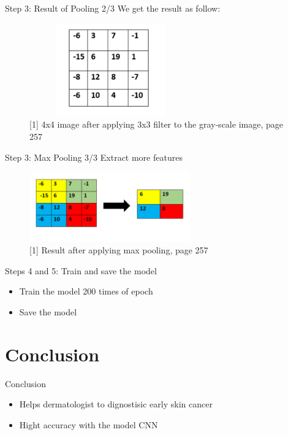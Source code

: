 \documentclass{beamer}
\begin{document}
\begin{frame}{Step 3: Result of Pooling 2/3}
We get the result as follow:
\begin{figure}[H]
    \includegraphics[width=7cm,height=4cm]{images/pooling.png}
    \caption{[1] 4x4 image after applying 3x3 filter to the gray-scale image, page 257}
    \label{fig:L1}
\end{figure}
\end{frame} 

\begin{frame}{Step 3: Max Pooling 3/3}
Extract more features
\begin{figure}[H]
    \includegraphics[width=7cm,height=3cm]{images/maxpooling.png}
    \caption{[1] Result after applying max pooling, page 257}
    \label{fig:L1}
\end{figure}
\end{frame} 

\begin{frame}{Steps 4 and 5: Train and save the model}
\begin{itemize}
		\item  Train the model 200 times of epoch
		\item Save the model 
\end{itemize}
\end{frame} 




\section{Conclusion}
\begin{frame}{Conclusion}
\begin{itemize}
		\item Helps dermatologist to dignostisic early skin cancer 
		\item Hight accuracy with the model CNN
\end{itemize}
\end{frame}
\end{document}
